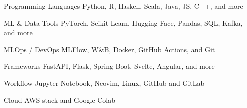 

\begin{cvskills}

\cvskill
  {Programming Languages}
  {Python, R, Haskell, Scala, Java, JS, C++, and more}

\cvskill
  {ML \& Data Tools}
  {PyTorch, Scikit-Learn, Hugging Face, Pandas, SQL, Kafka, and more}

\cvskill
  {MLOps / DevOps} {MLFlow, W\&B, Docker, GitHub Actions, and Git}

\cvskill
  {Frameworks}
  {FastAPI, Flask, Spring Boot, Svelte, Angular, and more}


\cvskill
  {Workflow}
  {Jupyter Notebook, Neovim, Linux, GitHub and GitLab}

\cvskill
  {Cloud}
  {AWS stack and Google Colab}

\end{cvskills}
